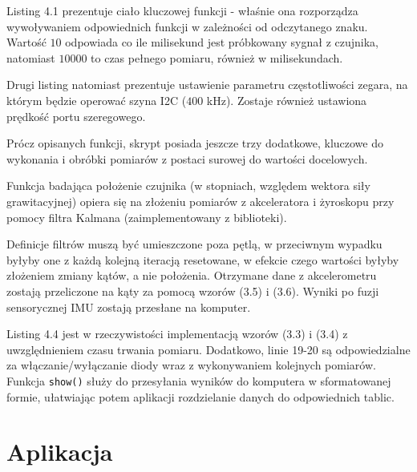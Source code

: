 

\newpage



Listing 4.1 prezentuje ciało kluczowej funkcji - właśnie ona rozporządza wywoływaniem odpowiednich funkcji w zależności od odczytanego znaku. Wartość $10$ odpowiada co ile milisekund jest próbkowany sygnał z czujnika, natomiast $10000$ to czas pełnego pomiaru, również w milisekundach.

Drugi listing natomiast prezentuje ustawienie parametru częstotliwości zegara, na którym będzie operować szyna I2C ($400$ kHz). Zostaje również ustawiona prędkość portu szeregowego.

Prócz opisanych funkcji, skrypt posiada jeszcze trzy dodatkowe, kluczowe do wykonania i obróbki pomiarów z postaci surowej do wartości docelowych.

Funkcja badająca położenie czujnika (w stopniach, względem wektora siły grawitacyjnej) opiera się na złożeniu pomiarów z akceleratora i żyroskopu przy pomocy filtra Kalmana (zaimplementowany z biblioteki).



Definicje filtrów muszą być umieszczone poza pętlą, w przeciwnym wypadku byłyby one z każdą kolejną iteracją resetowane, w efekcie czego wartości byłyby złożeniem zmiany kątów, a nie położenia. Otrzymane dane z akcelerometru zostają przeliczone na kąty za pomocą wzorów (3.5) i (3.6). Wyniki po fuzji sensorycznej IMU zostają przesłane na komputer.



Listing 4.4 jest w rzeczywistości implementacją wzorów (3.3) i (3.4) z uwzględnieniem czasu trwania pomiaru. Dodatkowo, linie 19-20 są odpowiedzialne za włączanie/wyłączanie diody wraz z wykonywaniem kolejnych pomiarów. Funkcja \lstinline{show()} służy do przesyłania wyników do komputera w sformatowanej formie, ułatwiając potem aplikacji rozdzielanie danych do odpowiednich tablic.

\section{Aplikacja}

